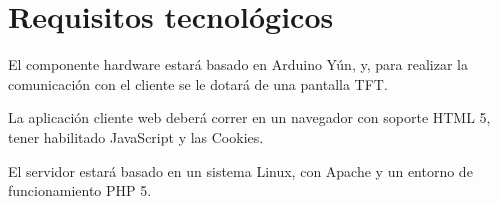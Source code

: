 \section{Requisitos tecnológicos}

El componente hardware estará basado en Arduino Yún, y, para realizar la comunicación con el cliente se le dotará de una pantalla TFT.

La aplicación cliente web deberá correr en un navegador con soporte HTML 5, tener habilitado JavaScript y las Cookies.

El servidor estará basado en un sistema Linux, con Apache y un entorno de funcionamiento PHP 5.